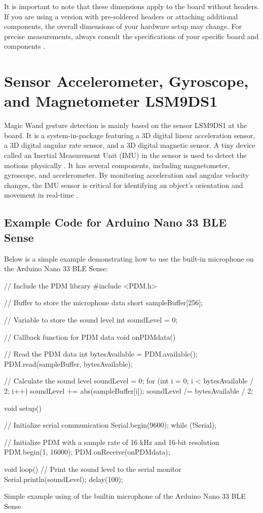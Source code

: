 It is important to note that these dimensions apply to the board without headers. If you are using a version with pre-soldered headers or attaching additional components, the overall dimensions of your hardware setup may change. For precise measurements, always consult the specifications of your specific board and components \cite{Arduino:2023}.


\section{Sensor Accelerometer, Gyroscope, and Magnetometer LSM9DS1}\label{boardsensor}

Magic Wand gesture detection is mainly based on the sensor LSM9DS1 at the board. It is a system-in-package featuring a 3D digital linear acceleration sensor, a 3D digital angular rate sensor, and a 3D digital magnetic sensor. A tiny device called an Inertial Measurement Unit (IMU) in the sensor is used to detect the motions physically \cite{Alushi:2023}. It has several components, including magnetometer, gyroscope, and accelerometer. By monitoring  acceleration and angular velocity changes, the IMU sensor is critical for identifying an object's orientation and movement in real-time \cite{Alushi:2023}.





\subsection*{Example Code for Arduino Nano 33 BLE Sense}
Below is a simple example demonstrating how to use the built-in microphone on the Arduino Nano 33 BLE Sense:

\begin{code}
	\begin{Arduino}
		// Include the PDM library
		#include <PDM.h>
		
		// Buffer to store the microphone data
		short sampleBuffer[256];
		
		// Variable to store the sound level
		int soundLevel = 0;
		
		// Callback function for PDM data
		void onPDMdata() {
			// Read the PDM data
			int bytesAvailable = PDM.available();
			PDM.read(sampleBuffer, bytesAvailable);
			
			// Calculate the sound level
			soundLevel = 0;
			for (int i = 0; i < bytesAvailable / 2; i++) {
				soundLevel += abs(sampleBuffer[i]);
			}
			soundLevel /= bytesAvailable / 2;
		}
		
		void setup() {
			// Initialize serial communication
			Serial.begin(9600);
			while (!Serial);
			
			// Initialize PDM with a sample rate of 16 kHz and 16-bit resolution
			PDM.begin(1, 16000);
			PDM.onReceive(onPDMdata);
		}
		
		void loop() {
			// Print the sound level to the serial monitor
			Serial.println(soundLevel);
			delay(100);
		}
	\end{Arduino}
	\caption{Simple example using of the builtin microphone of the Arduino Nano 33 BLE Sense}\label{code:microphone}
\end{code}

